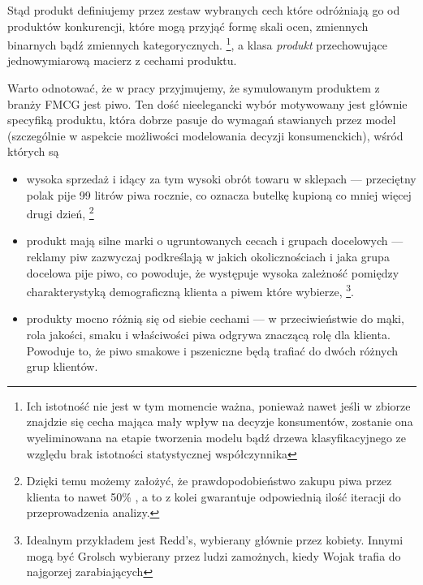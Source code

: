 \documentclass[polish, twoside, 12pt, a4paper]{article}
\theoremstyle{definition}
\theoremstyle{plain}
\theoremstyle{remark}
\begin{document}
Stąd produkt definiujemy przez zestaw wybranych cech które odróżniają go od produktów konkurencji, które mogą przyjąć formę skali ocen, zmiennych binarnych bądź zmiennych kategorycznych. \footnote{Ich istotność nie jest w tym momencie ważna, ponieważ nawet jeśli w zbiorze znajdzie się cecha mająca mały wpływ na decyzje konsumentów, zostanie ona wyeliminowana na etapie tworzenia modelu bądź drzewa klasyfikacyjnego ze względu brak istotności statystycznej współczynnika}, a klasa \textit{produkt} przechowujące jednowymiarową macierz z cechami produktu.

Warto odnotować, że w pracy przyjmujemy, że symulowanym produktem z branży FMCG jest piwo. Ten dość nieelegancki wybór motywowany jest głównie specyfiką produktu, która dobrze pasuje do wymagań stawianych przez model (szczególnie w aspekcie możliwości modelowania decyzji konsumenckich), wśród których są 

	\begin{itemize}
			\item wysoka sprzedaż i idący za tym wysoki obrót towaru w sklepach --- przeciętny polak pije 99 litrów piwa rocznie, co oznacza butelkę kupioną co mniej więcej drugi dzień, \footnote{Dzięki temu możemy założyć, że prawdopodobieństwo zakupu piwa przez klienta to nawet 50\% , a to z kolei gwarantuje odpowiednią ilość iteracji do przeprowadzenia analizy.} 
			\item produkt mają silne marki o ugruntowanych cecach i grupach docelowych --- reklamy piw zazwyczaj podkreślają w jakich okolicznościach i jaka grupa docelowa pije piwo, co powoduje, że występuje wysoka zależność pomiędzy charakterystyką demograficzną klienta a piwem które wybierze, \footnote{Idealnym przykładem jest Redd's, wybierany głównie przez kobiety. Innymi mogą być Grolsch wybierany przez ludzi zamożnych, kiedy Wojak trafia do najgorzej zarabiających}. 
			\item produkty mocno różnią się od siebie cechami --- w przeciwieństwie do mąki, rola jakości, smaku i właściwości piwa odgrywa znaczącą rolę dla klienta. Powoduje to, że piwo smakowe i pszeniczne będą trafiać do dwóch różnych grup klientów.
	\end{itemize}
\end{document}
